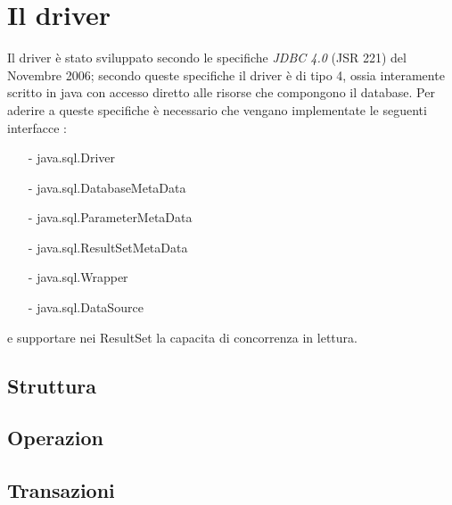 \section{Il driver}

Il driver è stato sviluppato secondo le specifiche \emph{JDBC 4.0} (JSR 221) del Novembre 2006; secondo queste specifiche il driver è di tipo 4, ossia interamente scritto in java con accesso diretto alle risorse che compongono il database. Per aderire a queste specifiche è necessario che vengano implementate le seguenti interfacce : 
\begin{itemize}
\item[-] java.sql.Driver
\item[-] java.sql.DatabaseMetaData
\item[-] java.sql.ParameterMetaData
\item[-] java.sql.ResultSetMetaData
\item[-] java.sql.Wrapper
\item[-] java.sql.DataSource
\end{itemize}
e supportare nei ResultSet la capacita di concorrenza in lettura. 




 

\subsection{Struttura}

\subsection{Operazion}	%

\subsection{Transazioni}	%